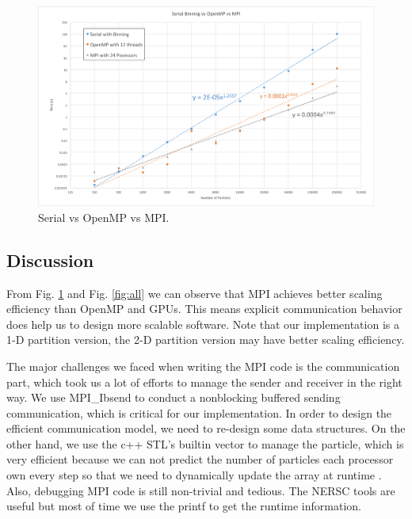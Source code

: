 \documentclass[12pt]{article}
\begin{document}
\begin{figure}
\includegraphics[width=\textwidth]{graphs/serialbinning_vs_openmp_vs_MPI.png}
  \caption{Serial vs OpenMP vs MPI.}
  \label{fig:serial-openmp-mpi}
\end{figure}

\subsection{Discussion}

From Fig. \ref{fig:serial-openmp-mpi} and Fig. \ref{fig:all} we can observe that MPI achieves better scaling efficiency than OpenMP and GPUs. This means explicit communication behavior does help us to design more scalable software. Note that our implementation is a 1-D partition version, the 2-D partition version may have better scaling efficiency.

The major challenges we faced when writing the MPI code is the communication part, which took us a lot of efforts to manage the sender and receiver in the right way. We use MPI\_Ibsend to conduct a nonblocking buffered sending communication, which is critical for our implementation. In order to design the efficient communication model, we need to re-design some data structures. On the other hand, we use the c++ STL's builtin vector to manage the particle, which is very efficient because we can not predict the number of particles each processor own every step so that we need to dynamically update the array at runtime . Also, debugging MPI code is still non-trivial and tedious. The NERSC tools are useful but most of time we use the printf to get the runtime information.

\end{document}
